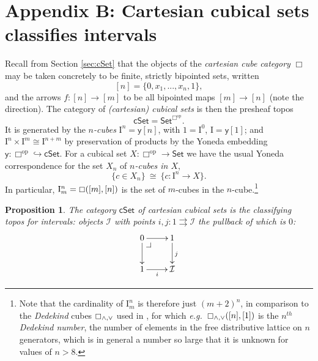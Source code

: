 \documentclass[11pt,reqno]{amsart}
\makeatletter
\newcommand{\eg}{\emph{e.g.}}
\newcommand{\C}{\ensuremath{\boxempty}}
\newcommand{\psh}[1]{\ensuremath{\mathsf{Set}^{#1^{\mathrm{op}}}}}
\newcommand{\Set}{\ensuremath{\mathsf{Set}}}
\newcommand{\cSet}{\ensuremath{\mathsf{cSet}}}
\newcommand{\yon}{\ensuremath{\mathsf{y}}} %
\newcommand{\op}[1]{\ensuremath{{#1}^{\mathrm{op}}}}
\newcommand{\hook}{\ensuremath{\hookrightarrow}}
\renewcommand{\to}{\ensuremath{\rightarrow}}
\newcommand{\I}{\ensuremath{\mathrm{I}}}
\newtheorem{proposition}[theorem]{Proposition}
\theoremstyle{remark}
\theoremstyle{definition}
\newcommand{\pbcorner}[1][dr]{\save*!/#1-1.2pc/#1:(-1,1)@^{|-}\restore}
\makeatother
\begin{document}
\section*{Appendix B: Cartesian cubical sets classifies intervals}\label{appendix:classtopos}

Recall from Section \ref{sec:cSet} that the objects of the \emph{cartesian cube category} $\Box$ may be taken concretely to be finite, strictly bipointed sets, written
\[
[n] = \{0, x_1, ..., x_n, 1\},
\]
 and the arrows $f : [n] \to [m]$ to be all bipointed maps $[m]\to [n]$ (note the direction). 
The category of \emph{(cartesian) cubical sets} is then the presheaf topos
\[
\cSet =  \psh{\Box}.
\]
It is generated by the \emph{$n$-cubes} $\I^n = \yon[n]$, with  $1 = \I^0$, $\I = \yon[1]$; and $\I^n \times \I^m \cong \I^{n+m}$ by preservation of products by the Yoneda embedding $\yon : \op{\Box} \hook\cSet$.  For a cubical set $X: \op{\Box} \to \Set$ we have the usual Yoneda correspondence for the set $X_n$ of  \emph{$n$-cubes in $X$},
\[
\{c \in X_n \} \ \cong\ \{c : \I^n \to X\}.
\]
In particular, $\I^n_m = \C([m],[n])$ is the set of $m$-cubes in the $n$-cube.\footnote{Note that the cardinality of $\I^n_m$ is therefore just $(m+2)^n$, in comparison to the \emph{Dedekind} cubes $\C_{\wedge,\vee}$ used in \cite{CCHM:2018ctt,orton-pitts}, for which \eg\ $\C_{\wedge,\vee}([n],[1])$ is the $n^{th}$ \emph{Dedekind number}, the number of elements in the free distributive lattice on $n$ generators, which is in general a number so large that it is unknown for values of $n>8$.} 

\begin{proposition}\label{prop:csetclassifiesintervals}
The category $\cSet$ of cartesian cubical sets is the classifying topos for \emph{intervals}: objects $\mathcal{I}$ with points $i,j:1\rightrightarrows \mathcal{I}$ the pullback of which is $0$:
\[
\xymatrix{
0 \ar[d] \ar[r] \pbcorner & 1 \ar[d]^j  \\
1 \ar[r]_i & \mathcal{I}
}
\]
\end{proposition}
\end{document}
